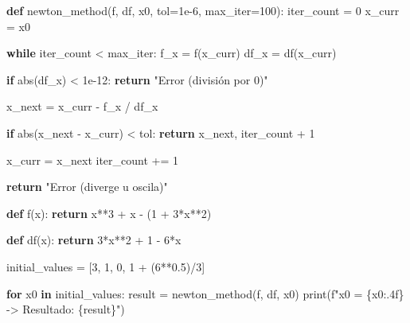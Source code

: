 \documentclass[
  letterpaper,
  DIV=11,
  numbers=noendperiod]{scrartcl}
\newenvironment{Shaded}{\begin{snugshade}}{\end{snugshade}}
\newcommand{\BuiltInTok}[1]{\textcolor[rgb]{0.00,0.23,0.31}{#1}}
\newcommand{\ControlFlowTok}[1]{\textcolor[rgb]{0.00,0.23,0.31}{\textbf{#1}}}
\newcommand{\DecValTok}[1]{\textcolor[rgb]{0.68,0.00,0.00}{#1}}
\newcommand{\FloatTok}[1]{\textcolor[rgb]{0.68,0.00,0.00}{#1}}
\newcommand{\KeywordTok}[1]{\textcolor[rgb]{0.00,0.23,0.31}{\textbf{#1}}}
\newcommand{\NormalTok}[1]{\textcolor[rgb]{0.00,0.23,0.31}{#1}}
\newcommand{\OperatorTok}[1]{\textcolor[rgb]{0.37,0.37,0.37}{#1}}
\newcommand{\SpecialCharTok}[1]{\textcolor[rgb]{0.37,0.37,0.37}{#1}}
\newcommand{\SpecialStringTok}[1]{\textcolor[rgb]{0.13,0.47,0.30}{#1}}
\newcommand{\StringTok}[1]{\textcolor[rgb]{0.13,0.47,0.30}{#1}}
\begin{document}
\begin{Shaded}
\begin{Highlighting}[]
\KeywordTok{def}\NormalTok{ newton\_method(f, df, x0, tol}\OperatorTok{=}\FloatTok{1e{-}6}\NormalTok{, max\_iter}\OperatorTok{=}\DecValTok{100}\NormalTok{):}
\NormalTok{    iter\_count }\OperatorTok{=} \DecValTok{0}
\NormalTok{    x\_curr }\OperatorTok{=}\NormalTok{ x0}

    \ControlFlowTok{while}\NormalTok{ iter\_count }\OperatorTok{\textless{}}\NormalTok{ max\_iter:}
\NormalTok{        f\_x }\OperatorTok{=}\NormalTok{ f(x\_curr)}
\NormalTok{        df\_x }\OperatorTok{=}\NormalTok{ df(x\_curr)}
        
        \ControlFlowTok{if} \BuiltInTok{abs}\NormalTok{(df\_x) }\OperatorTok{\textless{}} \FloatTok{1e{-}12}\NormalTok{:}
            \ControlFlowTok{return} \StringTok{"Error (división por 0)"}

\NormalTok{        x\_next }\OperatorTok{=}\NormalTok{ x\_curr }\OperatorTok{{-}}\NormalTok{ f\_x }\OperatorTok{/}\NormalTok{ df\_x}
        
        \ControlFlowTok{if} \BuiltInTok{abs}\NormalTok{(x\_next }\OperatorTok{{-}}\NormalTok{ x\_curr) }\OperatorTok{\textless{}}\NormalTok{ tol:}
            \ControlFlowTok{return}\NormalTok{ x\_next, iter\_count }\OperatorTok{+} \DecValTok{1}

\NormalTok{        x\_curr }\OperatorTok{=}\NormalTok{ x\_next}
\NormalTok{        iter\_count }\OperatorTok{+=} \DecValTok{1}

    \ControlFlowTok{return} \StringTok{"Error (diverge u oscila)"}

\KeywordTok{def}\NormalTok{ f(x):}
    \ControlFlowTok{return}\NormalTok{ x}\OperatorTok{**}\DecValTok{3} \OperatorTok{+}\NormalTok{ x }\OperatorTok{{-}}\NormalTok{ (}\DecValTok{1} \OperatorTok{+} \DecValTok{3}\OperatorTok{*}\NormalTok{x}\OperatorTok{**}\DecValTok{2}\NormalTok{)}

\KeywordTok{def}\NormalTok{ df(x):}
    \ControlFlowTok{return} \DecValTok{3}\OperatorTok{*}\NormalTok{x}\OperatorTok{**}\DecValTok{2} \OperatorTok{+} \DecValTok{1} \OperatorTok{{-}} \DecValTok{6}\OperatorTok{*}\NormalTok{x}

\NormalTok{initial\_values }\OperatorTok{=}\NormalTok{ [}\DecValTok{3}\NormalTok{, }\DecValTok{1}\NormalTok{, }\DecValTok{0}\NormalTok{, }\DecValTok{1} \OperatorTok{+}\NormalTok{ (}\DecValTok{6}\OperatorTok{**}\FloatTok{0.5}\NormalTok{)}\OperatorTok{/}\DecValTok{3}\NormalTok{]}

\ControlFlowTok{for}\NormalTok{ x0 }\KeywordTok{in}\NormalTok{ initial\_values:}
\NormalTok{    result }\OperatorTok{=}\NormalTok{ newton\_method(f, df, x0)}
    \BuiltInTok{print}\NormalTok{(}\SpecialStringTok{f"x0 = }\SpecialCharTok{\{}\NormalTok{x0}\SpecialCharTok{:.4f\}}\SpecialStringTok{ {-}\textgreater{} Resultado: }\SpecialCharTok{\{}\NormalTok{result}\SpecialCharTok{\}}\SpecialStringTok{"}\NormalTok{)}
\end{Highlighting}
\end{Shaded}
\end{document}
